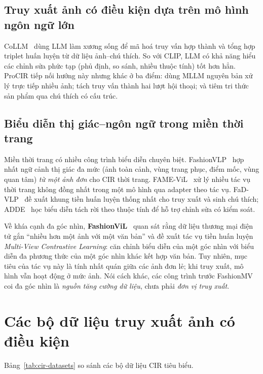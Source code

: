 \subsection{Truy xuất ảnh có điều kiện dựa trên mô hình ngôn ngữ lớn}

CoLLM~\cite{huynh2025collm} dùng LLM làm xương sống để mã hoá truy vấn hợp thành và tổng hợp triplet huấn luyện từ dữ liệu ảnh--chú thích. So với CLIP, LLM có khả năng hiểu các chỉnh sửa phức tạp (phủ định, so sánh, nhiều thuộc tính) tốt hơn hẳn. ProCIR tiếp nối hướng này nhưng khác ở ba điểm: dùng MLLM nguyên bản xử lý trực tiếp nhiều ảnh; tách truy vấn thành hai lượt hội thoại; và tiêm tri thức sản phẩm qua chú thích có cấu trúc.

\subsection{Biểu diễn thị giác--ngôn ngữ trong miền thời trang}

Miền thời trang có nhiều công trình biểu diễn chuyên biệt. FashionVLP~\cite{goenka2022fashionvlp} hợp nhất ngữ cảnh thị giác đa mức (ảnh toàn cảnh, vùng trang phục, điểm mốc, vùng quan tâm) \emph{từ một ảnh đơn} cho CIR thời trang. FAME-ViL~\cite{han2023famevil} xử lý nhiều tác vụ thời trang không đồng nhất trong một mô hình qua adapter theo tác vụ. FaD-VLP~\cite{mirchandani2022fadvlp} đề xuất khung tiền huấn luyện thống nhất cho truy xuất và sinh chú thích; ADDE~\cite{hou2021adde} học biểu diễn tách rời theo thuộc tính để hỗ trợ chỉnh sửa có kiểm soát.

Về khía cạnh đa góc nhìn, \textbf{FashionViL}~\cite{han2022fashionvil} quan sát rằng dữ liệu thương mại điện tử gắn ``nhiều hơn một ảnh với một văn bản'' và đề xuất tác vụ tiền huấn luyện \emph{Multi-View Contrastive Learning}: căn chỉnh biểu diễn của một góc nhìn với biểu diễn đa phương thức của một góc nhìn khác kết hợp văn bản. Tuy nhiên, mục tiêu của tác vụ này là tính nhất quán giữa các ảnh đơn lẻ; khi truy xuất, mô hình vẫn hoạt động ở mức ảnh. Nói cách khác, các công trình trước FashionMV coi đa góc nhìn là \emph{nguồn tăng cường dữ liệu}, chưa phải \emph{đơn vị truy xuất}.

\section{Các bộ dữ liệu truy xuất ảnh có điều kiện}\label{sec:related-datasets}

Bảng~\ref{tab:cir-datasets} so sánh các bộ dữ liệu CIR tiêu biểu.

